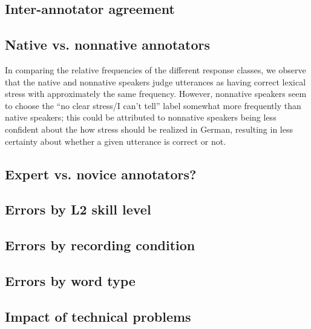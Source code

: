 		\subsection{Inter-annotator agreement}
		\label{sec:results:agreement}
		
		\TODO{}
	
	
		\subsection{Native vs. nonnative annotators}
		\label{sec:results:native}
		
		

		In comparing the relative frequencies of the different response classes, we observe that the native and nonnative speakers judge utterances as having correct lexical stress with approximately the same frequency. However, nonnative speakers seem to choose the ``no clear stress/I can't tell'' label somewhat more frequently than native speakers; this could be attributed to nonnative speakers being less confident about the how stress should be realized in German, resulting in less certainty about whether a given utterance is correct or not. 
		
		\subsection{Expert vs. novice annotators?}
		\label{sec:results:expert}
		
			\TODO{}
		
		\subsection{Errors by L2 skill level}
		\label{sec:results:level}
		
			\TODO{}
		
		\subsection{Errors by recording condition}
		\label{sec:results:condition}
			\TODO{}
		
		
		\subsection{Errors by word type}
		\label{sec:results:wordtype}
			\TODO{}
	
		\subsection{Impact of technical problems}
		\label{sec:results:techproblems}
			\TODO{}